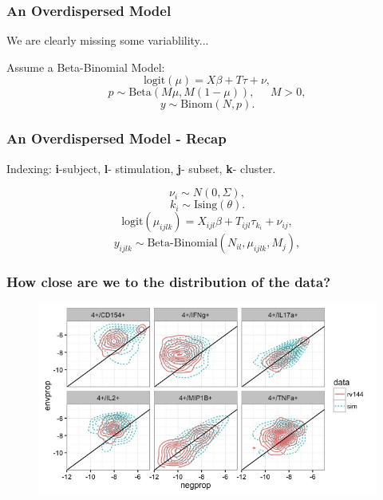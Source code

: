 \documentclass{beamer}
\theoremstyle{definition}
\begin{document}

\begin{frame}
\frametitle{An Overdispersed Model}
We are clearly missing some variablility... 
\vspace{0.3 cm}

Assume a Beta-Binomial Model:
$$
\text{logit}(\mu) = X\beta + T\tau + \nu,
$$$$
p \sim \text{Beta}(M\mu, M(1-\mu)), \;\;\;\;\; M>0,
$$$$
y \sim \text{Binom}(N, p).
$$
\end{frame}


\begin{frame}
\frametitle{An Overdispersed Model - Recap}
\begin{framed}
Indexing: \textbf{i}-subject, \textbf{l}- stimulation, \textbf{j}- subset, \textbf{k}- cluster.
\end{framed}

$$
\nu_i \sim N(0, \Sigma),
$$$$
k_i \sim \text{Ising}(\theta).
$$$$
\text{logit}(\mu_{ijlk}) = X_{ijl} \beta + T_{ijl}\tau_{k_i} + \nu_{ij} ,
$$$$
y_{ijlk} \sim \text{Beta-Binomial}(N_{il}, \mu_{ijlk}, M_j) ,
$$
\end{frame}


\begin{frame}
\frametitle{How close are we to the distribution of the data?}
\begin{figure}[]
\includegraphics[width=12 cm]{figures/simVsRealContour} 
\end{figure}
\end{frame}

\end{document}
